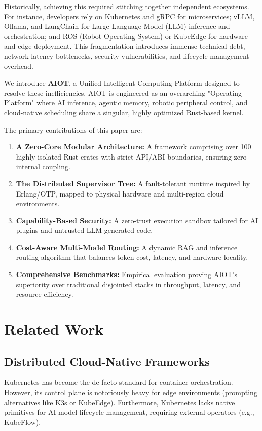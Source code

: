 \documentclass[conference,compsoc]{IEEEtran}
\begin{document}
Historically, achieving this required stitching together independent ecosystems. For instance, developers rely on Kubernetes and gRPC for microservices; vLLM, Ollama, and LangChain for Large Language Model (LLM) inference and orchestration; and ROS (Robot Operating System) or KubeEdge for hardware and edge deployment. This fragmentation introduces immense technical debt, network latency bottlenecks, security vulnerabilities, and lifecycle management overhead.

We introduce \textbf{AIOT}, a Unified Intelligent Computing Platform designed to resolve these inefficiencies. AIOT is engineered as an overarching "Operating Platform" where AI inference, agentic memory, robotic peripheral control, and cloud-native scheduling share a singular, highly optimized Rust-based kernel. 

The primary contributions of this paper are:
\begin{enumerate}
    \item \textbf{A Zero-Core Modular Architecture:} A framework comprising over 100 highly isolated Rust crates with strict API/ABI boundaries, ensuring zero internal coupling.
    \item \textbf{The Distributed Supervisor Tree:} A fault-tolerant runtime inspired by Erlang/OTP, mapped to physical hardware and multi-region cloud environments.
    \item \textbf{Capability-Based Security:} A zero-trust execution sandbox tailored for AI plugins and untrusted LLM-generated code.
    \item \textbf{Cost-Aware Multi-Model Routing:} A dynamic RAG and inference routing algorithm that balances token cost, latency, and hardware locality.
    \item \textbf{Comprehensive Benchmarks:} Empirical evaluation proving AIOT's superiority over traditional disjointed stacks in throughput, latency, and resource efficiency.
\end{enumerate}

\section{Related Work}
\subsection{Distributed Cloud-Native Frameworks}
Kubernetes has become the de facto standard for container orchestration. However, its control plane is notoriously heavy for edge environments (prompting alternatives like K3s or KubeEdge). Furthermore, Kubernetes lacks native primitives for AI model lifecycle management, requiring external operators (e.g., KubeFlow).
\end{document}
